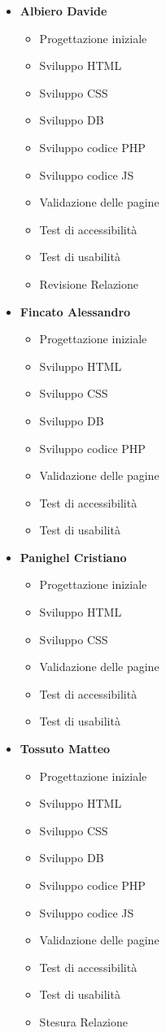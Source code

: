 \begin{itemize}	
	\item \textbf{Albiero Davide}
	\begin{itemize}
		\item Progettazione iniziale
		\item Sviluppo HTML
		\item Sviluppo CSS
		\item Sviluppo DB
		\item Sviluppo codice PHP
		\item Sviluppo codice JS
		\item Validazione delle pagine
		\item Test di accessibilità
		\item Test di usabilità
		\item Revisione Relazione
	\end{itemize}	
	\item \textbf{Fincato Alessandro}
	\begin{itemize}
		\item Progettazione iniziale
		\item Sviluppo HTML
		\item Sviluppo CSS
		\item Sviluppo DB
		\item Sviluppo codice PHP
		\item Validazione delle pagine
		\item Test di accessibilità
		\item Test di usabilità
	\end{itemize}	
	\item \textbf{Panighel Cristiano}
	\begin{itemize}
		\item Progettazione iniziale
		\item Sviluppo HTML
		\item Sviluppo CSS
		\item Validazione delle pagine
		\item Test di accessibilità
		\item Test di usabilità
	\end{itemize}	
	\item \textbf{Tossuto Matteo}
	\begin{itemize}
		\item Progettazione iniziale
		\item Sviluppo HTML
		\item Sviluppo CSS
		\item Sviluppo DB
		\item Sviluppo codice PHP
		\item Sviluppo codice JS
		\item Validazione delle pagine
		\item Test di accessibilità
		\item Test di usabilità
		\item Stesura Relazione
	\end{itemize}
\end{itemize}

